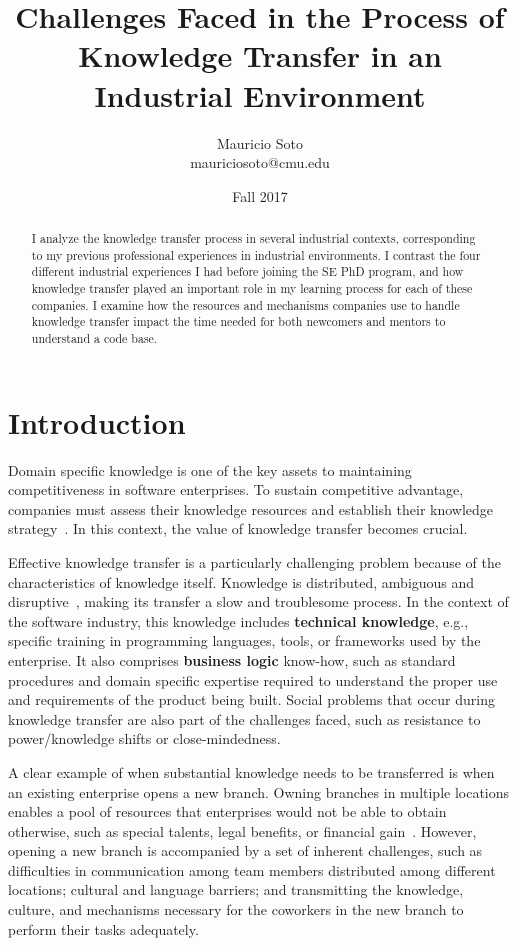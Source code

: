 \documentclass[12pt, letterpaper]{article}
\title{Challenges Faced in the Process of Knowledge Transfer in an Industrial Environment}
\author{Mauricio Soto\\
mauriciosoto@cmu.edu
}
\date{Fall 2017}
\begin{document}
 
\begin{titlepage}
\maketitle


\begin{abstract}
I analyze the knowledge transfer process in several industrial contexts, corresponding to my 
previous professional experiences in industrial environments.
I contrast the four different industrial experiences I had before joining the SE PhD program, and 
how knowledge transfer played an important role in my learning process for each of these companies.
I examine how the resources and mechanisms companies use to handle knowledge transfer impact the time needed for both newcomers and mentors to understand a code base. 
\end{abstract}
\end{titlepage}
 
\section{Introduction}

Domain specific knowledge is one of the key assets to maintaining competitiveness in 
software enterprises.
To sustain competitive advantage, companies must assess their knowledge resources and 
establish their knowledge strategy~\cite{civi00}. In this context, the value of knowledge transfer 
becomes crucial.

Effective knowledge transfer is a particularly challenging problem because of the characteristics of
knowledge itself. Knowledge is distributed, ambiguous and 
disruptive~\cite{Newell06}, making its transfer a
slow and troublesome process. 
In the context of the software industry, this knowledge includes \textbf{technical
knowledge}, e.g., specific training in 
programming languages, tools, or frameworks used by the enterprise. It also comprises
\textbf{business logic} know-how, such as standard procedures and domain specific 
expertise required to understand the proper use and requirements of the product being built.
Social problems that occur during knowledge transfer are also part of the 
challenges faced, such as resistance to power/knowledge shifts or close-mindedness.

A clear example of when substantial knowledge needs to be transferred is when an existing 
enterprise opens a new branch.
Owning branches in multiple locations enables a pool of resources that enterprises would not be able
to obtain otherwise, such as special talents, legal benefits, or financial gain~\cite{ceruttia07}. However, 
opening a new branch is accompanied by a set of inherent challenges, such as 
difficulties in communication among team members distributed among different locations;
cultural and language barriers; and transmitting the knowledge, culture, and mechanisms necessary for the 
coworkers in the new branch to perform their tasks adequately.
\end{document}
